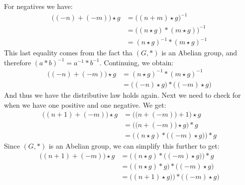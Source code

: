     For negatives we have:
    \begin{subequations}
        \begin{align}
            \big((\minus{n})+(\minus{m})\big)\star{g}
                &=\big((n+m)\star{g}\big)^{\minus{1}}\\
                &=\big((n\star{g})*(m\star{g})\big)^{\minus{1}}\\
                &=(n\star{g})^{\minus{1}}*(m\star{g})^{\minus{1}}
        \end{align}
    \end{subequations}
    This last equality comes from the fact tha $(G,*)$ is an Abelian group, and
    therefore $(a*b)^{\minus{1}}=a^{\minus{1}}*b^{\minus{1}}$. Continuing, we
    obtain:
    \begin{subequations}
        \begin{align}
            \big((\minus{n})+(\minus{m})\big)\star{g}
            &=(n\star{g})^{\minus{1}}*(m\star{g})^{\minus{1}}\\
            &=\big((\minus{n})\star{g}\big)*\big((\minus{m})\star{g}\big)
        \end{align}
    \end{subequations}
    And thus we have the distributive law holds again. Next we need to check for
    when we have one positive and one negative. We get:
    \begin{subequations}
        \begin{align}
            \big((n+1)+(\minus{m})\big)\star{g}
            &=\Big(\big(n+(\minus{m})\big)+1\Big)\star{g}\\
            &=\Big(\big(n+(\minus{m})\big)\star{g}\Big)*g\\
            &=\Big((n\star{g})*\big((\minus{m})\star{g}\big)\Big)*g
        \end{align}
    \end{subequations}
    Since $(G,*)$ is an Abelian group, we can simplify this further to get:
    \begin{subequations}
        \begin{align}
            \big((n+1)+(\minus{m})\big)\star{g}
            &=\Big((n\star{g})*\big((\minus{m})\star{g}\big)\Big)*g\\
            &=\Big((n\star{g})*g\Big)*\big((\minus{m})\star{g}\big)\\
            &=\Big((n+1)\star{g})\Big)*\big((\minus{m})\star{g}\big)
        \end{align}
    \end{subequations}

